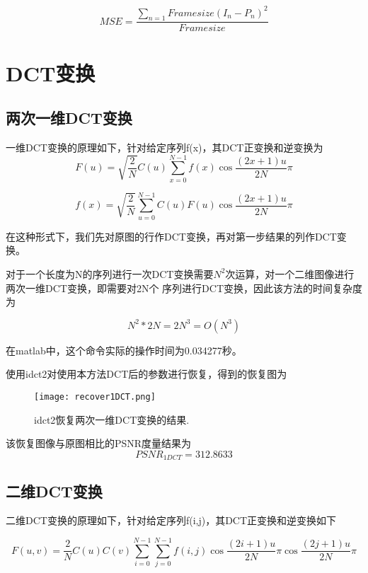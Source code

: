 \documentclass{ctexart}
\begin{document}
\begin{equation}
MSE = \frac {\sum_{n = 1}{Framesize} {(I_n - P_n)}^2} {Framesize}
\end{equation}
\section{DCT变换}
\subsection{两次一维DCT变换}

一维DCT变换的原理如下，针对给定序列f(x)，其DCT正变换和逆变换为
\begin{equation}
F(u) = \sqrt{\frac {2} {N}} C(u) \sum_{x = 0}^{N - 1}f(x) \cos {\frac{(2x + 1)u} {2N} \pi}
\end{equation}

\begin{equation}
f(x) = \sqrt{\frac {2} {N}}\sum_{u = 0}^{N - 1}C(u)F(u) \cos {\frac{(2x + 1)u} {2N} \pi}
\end{equation}

在这种形式下，我们先对原图的行作DCT变换，再对第一步结果的列作DCT变换。

对于一个长度为N的序列进行一次DCT变换需要$N^2$次运算，对一个二维图像进行两次一维DCT变换，即需要对2N个
序列进行DCT变换，因此该方法的时间复杂度为

\begin{equation}
N^2 * 2N = 2N^3 = O(N^3)
\end{equation}

在matlab中，这个命令实际的操作时间为0.034277秒。

使用idct2对使用本方法DCT后的参数进行恢复，得到的恢复图为

\begin{figure}
\centering
\texttt{[image: recover1DCT.png]}
\caption{idct2恢复两次一维DCT变换的结果.}
\end{figure}

该恢复图像与原图相比的PSNR度量结果为
\begin{equation}
PSNR_{1DCT} = 312.8633
\end{equation}
\subsection{二维DCT变换}
二维DCT变换的原理如下，针对给定序列f(i,j)，其DCT正变换和逆变换如下

\begin{equation}
F(u, v) = {\frac {2} {N}} C(u) C(v) \sum_{i = 0}^{N - 1} \sum_{j = 0}^{N - 1}f(i,j) \cos {\frac{(2i + 1)u} {2N} \pi} \cos {\frac{(2j + 1)u} {2N} \pi}
\end{equation}
\end{document}
